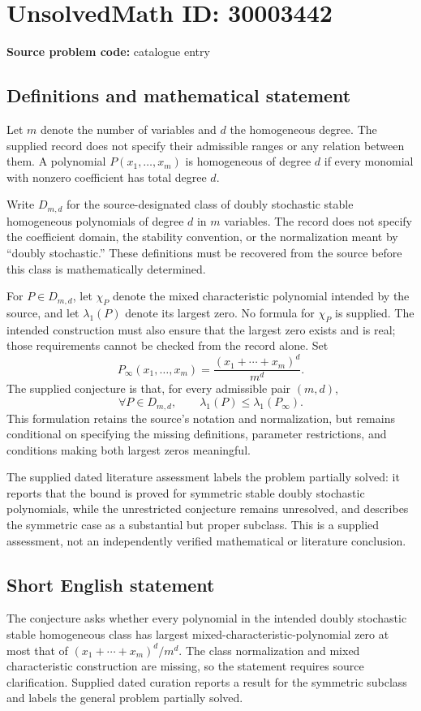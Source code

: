 \documentclass[11pt]{article}
\begin{document}
\section*{UnsolvedMath ID: 30003442}
\textbf{Source problem code:} catalogue entry
\subsection{Definitions and mathematical statement}
Let \(m\) denote the number of variables and \(d\) the homogeneous degree. The supplied record does not specify their admissible ranges or any relation between them. A polynomial \(P(x_1,\ldots,x_m)\) is homogeneous of degree \(d\) if every monomial with nonzero coefficient has total degree \(d\).

Write \(D_{m,d}\) for the source-designated class of doubly stochastic stable homogeneous polynomials of degree \(d\) in \(m\) variables. The record does not specify the coefficient domain, the stability convention, or the normalization meant by ``doubly stochastic.'' These definitions must be recovered from the source before this class is mathematically determined.

For \(P\in D_{m,d}\), let \(\chi_P\) denote the mixed characteristic polynomial intended by the source, and let \(\lambda_1(P)\) denote its largest zero. No formula for \(\chi_P\) is supplied. The intended construction must also ensure that the largest zero exists and is real; those requirements cannot be checked from the record alone. Set
\[
P_\infty(x_1,\ldots,x_m)=\frac{(x_1+\cdots+x_m)^d}{m^d}.
\]
The supplied conjecture is that, for every admissible pair \((m,d)\),
\[
\forall P\in D_{m,d},\qquad
\lambda_1(P)\leq\lambda_1(P_\infty).
\]
This formulation retains the source's notation and normalization, but remains conditional on specifying the missing definitions, parameter restrictions, and conditions making both largest zeros meaningful.

The supplied dated literature assessment labels the problem partially solved: it reports that the bound is proved for symmetric stable doubly stochastic polynomials, while the unrestricted conjecture remains unresolved, and describes the symmetric case as a substantial but proper subclass. This is a supplied assessment, not an independently verified mathematical or literature conclusion.
\subsection{Short English statement}
The conjecture asks whether every polynomial in the intended doubly stochastic stable homogeneous class has largest mixed-characteristic-polynomial zero at most that of \((x_1+\cdots+x_m)^d/m^d\). The class normalization and mixed characteristic construction are missing, so the statement requires source clarification. Supplied dated curation reports a result for the symmetric subclass and labels the general problem partially solved.
\end{document}
